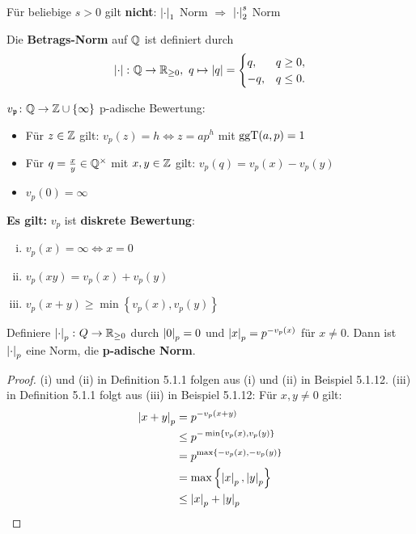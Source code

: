 \begin{Bem}
Für beliebige $s>0$ gilt \textbf{nicht}: $\left|{\cdot}\right|_1$ Norm $\Rightarrow$ $\left|{\cdot}\right|_2^s$ Norm 
\end{Bem}

\begin{Bsp}
Die \textbf{Betrags-Norm} auf $\mathbb{Q}$ ist definiert durch
\[ \left|{\cdot}\right| \colon \mathbb{Q} \to \mathbb{R}_{\geq 0}, \ q\mapsto \left|{q}\right| = \begin{cases}
q, &\mbox{} q \geq 0, \\
-q, &\mbox{} q \leq 0.
\end{cases}
\]
\end{Bsp}

\begin{recall*}
$v_{\mathfrak{p}} \colon \mathbb{Q} \to \mathbb{Z} \cup \{\infty \}$ p-adische Bewertung:
\begin{itemize}
\item Für $z \in \mathbb{Z}$ gilt: $v_p(z) = h \Leftrightarrow z =ap^h$ mit $\operatorname{ggT}(a,p)=1$
\item Für $q = \frac{x}{y} \in \mathbb{Q}^\times$ mit $x,y \in \mathbb{Z}$ gilt: $v_p(q) = v_p(x)-v_p(y)$
\item $v_p(0) = \infty$
\end{itemize}

\textbf{Es gilt:} $v_p$ ist \textbf{diskrete Bewertung}:
\begin{enumerate}[(i)]
\item $v_p(x) = \infty\Leftrightarrow x = 0$
\item $v_p(xy) = v_p(x) + v_p(y)$
\item $v_p(x+y) \geq \min \left\{ v_p(x), v_p(y) \right\}$
\end{enumerate}
\end{recall*}

\begin{Bem}
Definiere $\left|{\cdot}\right|_p \colon Q \to \mathbb{R}_{\geq 0}$ durch $\left|{0}\right|_p = 0$ und 
$\left|{x}\right|_p = p^{-v_p(x)}$ für $x \neq 0$. Dann ist $\left|{\cdot}\right|_p$ eine Norm, die \textbf{p-adische Norm}.
\end{Bem}


\begin{proof}
(i) und (ii) in Definition 5.1.1 folgen aus (i) und (ii) in Beispiel 5.1.12.
(iii) in Definition 5.1.1 folgt aus (iii) in Beispiel 5.1.12: Für $x,y \neq 0$ gilt:
\begin{align*}
\left|{x+y}\right|_p
&= p^{-v_p(x+y)} \\
&\leq p^{- \min \left\{ v_p(x), v_p(y) \right\}} \\
&= p^{\max \left\{ -v_p(x), -v_p(y) \right\}} \\
&=\max\left\{ \left|{x}\right|_p, \left|{y}\right|_p \right\} \\
&\leq \left|{x}\right|_p + \left|{y}\right|_p \\
\end{align*}
\end{proof}

